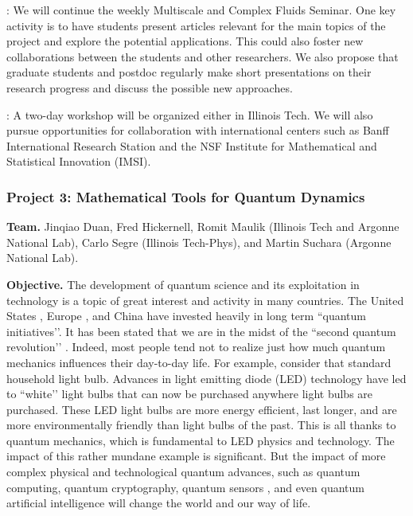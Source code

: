 \documentclass[11pt]{NSFamsart}
\begin{document}
: {We will continue the weekly Multiscale and Complex Fluids Seminar. One key activity is to have students present articles relevant for the main topics of the project and explore the potential applications. This could also foster new collaborations between the students and other researchers. We also propose that graduate students and postdoc regularly make short presentations on their research progress and discuss the possible new approaches.}

:  A two-day workshop will be organized either in Illinois Tech. We will also pursue opportunities for collaboration with international centers such as Banff International Research Station and the NSF Institute for Mathematical and Statistical Innovation (IMSI).




\subsubsection*{Project 3: Mathematical Tools for Quantum Dynamics}
\noindent
{\bf Team.}  Jinqiao Duan, Fred Hickernell, Romit Maulik (Illinois Tech and Argonne National Lab), Carlo Segre (Illinois Tech-Phys), and Martin Suchara (Argonne National Lab).
\medskip

\noindent
{\bf Objective.} The development of quantum science and its exploitation in technology is a topic of great interest and activity in many countries. The United States \cite{raymer2019us}, Europe \cite{riedel2019europe}, and China \cite{kania2018quantum} have invested heavily in long term ``quantum initiatives’’.  It has been stated that we are in the midst of the ``second quantum revolution’’ \cite{kania2018quantum}. Indeed,  most people tend not to realize just how much quantum mechanics influences their day-to-day life. For example, consider that standard household light bulb. Advances in light emitting diode (LED) technology have led to ``white’’ light bulbs that can now be purchased anywhere light bulbs are purchased. These LED light bulbs are more energy efficient, last longer, and are more environmentally friendly than light bulbs of the past. This is all thanks to quantum mechanics, which is fundamental to LED physics and technology. The impact of this rather mundane example is significant. But the impact of more complex physical and technological quantum advances, such as quantum computing, quantum cryptography, quantum sensors \cite{ng2020guest}, and even quantum artificial intelligence \cite{taylor2020quantum} will change the world and our way of life.
\end{document}
